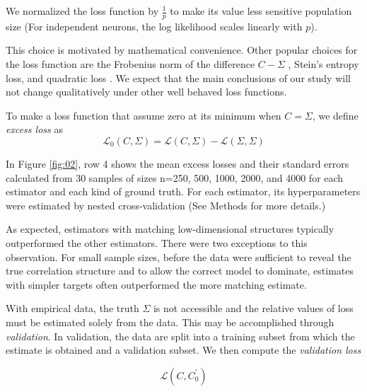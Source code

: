 \documentclass[10pt]{article}
\newcommand{\loss}[1]{\mathcal L\left(#1\right)}
\newcommand{\eloss}[1]{\mathcal L_0\left(#1\right)}
\begin{document}
We normalized the loss function  by $\frac 1 p$ to make its value less sensitive population size (For independent neurons, the log likelihood scales linearly with $p$).

This choice is motivated by mathematical convenience. Other popular choices for the loss function are the Frobenius norm of the difference $C-\Sigma$ \cite{Ledoit:2004,Schafer:2005}, Stein's entropy loss, and quadratic loss \cite{James:1961,Fan:2008}.  We expect that the main conclusions of our study will not change qualitatively under other well behaved loss functions.

To make a loss function that assume zero at its minimum when $C=\Sigma$, we define \emph{excess loss} as
\begin{equation}\label{eq:excess-loss}
    \eloss{C,\Sigma} = \loss{C,\Sigma}-\loss{\Sigma,\Sigma}
\end{equation}

In Figure \ref{fig:02}, row 4 shows the mean excess losses and their standard errors calculated from 30 samples of sizes n=250, 500, 1000, 2000, and 4000 for each estimator and each kind of ground truth. For each estimator, its hyperparameters were estimated by nested cross-validation (See Methods for more details.)

As expected, estimators with matching low-dimensional structures typically outperformed the other estimators. There were two exceptions to this observation. For small sample sizes, before the data were sufficient to reveal the true correlation structure and to  allow the correct model to dominate, estimates with simpler targets often outperformed the more matching estimate.

With empirical data, the truth $\Sigma$ is not accessible and the relative values of loss must be estimated solely from the data. This may be accomplished through \emph{validation}.  In validation, the data are split into a training subset from which the estimate is obtained and a validation subset. We then compute the \emph{validation loss} 

\begin{equation}\label{eq:validation-loss}
    \loss{C,C^\prime_0}
\end{equation}
\end{document}
